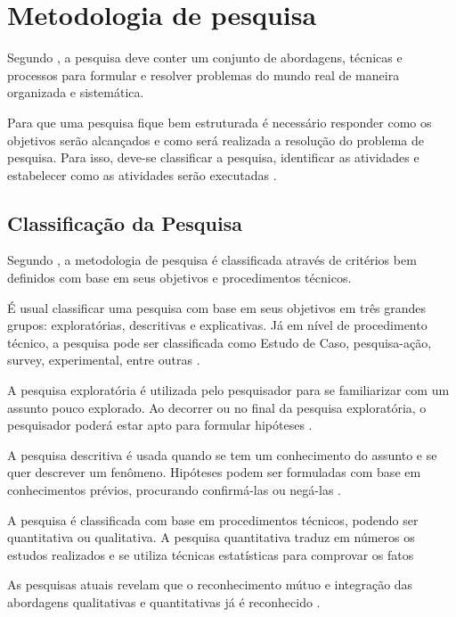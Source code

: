  \chapter{Metodologia de pesquisa}
\label{sec:metodologia}

Segundo , a pesquisa deve conter um conjunto de abordagens, técnicas e processos para formular e resolver problemas do mundo real de maneira organizada e sistemática.

Para que uma pesquisa fique bem estruturada é necessário responder como os objetivos serão alcançados e  como será realizada a resolução do problema de pesquisa. Para isso, deve-se classificar a pesquisa, identificar as atividades e estabelecer como as atividades serão executadas \cite{forcon2014}.

\section{Classificação da Pesquisa}

Segundo , a metodologia de pesquisa é classificada através de critérios bem definidos com base em seus objetivos e procedimentos técnicos.

É usual classificar uma pesquisa com base em seus objetivos em três grandes grupos: exploratórias, descritivas e explicativas. Já em nível de procedimento técnico, a pesquisa pode ser classificada como Estudo de Caso, pesquisa-ação, survey, experimental, entre outras \cite[pág.~41]{gil2008}.

A pesquisa exploratória é utilizada pelo pesquisador para se familiarizar com um assunto pouco explorado. Ao decorrer ou no final da pesquisa exploratória, o pesquisador poderá estar apto para formular hipóteses \cite{giudice}.

A pesquisa descritiva é usada quando se tem um conhecimento do assunto e se quer descrever um fenômeno. Hipóteses podem ser formuladas com base em conhecimentos prévios, procurando confirmá-las ou negá-las \cite[pág.~21]{fonseca2002}.

A pesquisa é classificada com base em procedimentos técnicos, podendo ser quantitativa ou qualitativa. A pesquisa quantitativa traduz em números os estudos realizados e se utiliza técnicas estatísticas para comprovar os fatos \cite[pág.~9]{rodrigues2007}


As pesquisas atuais revelam que o reconhecimento mútuo e integração das abordagens qualitativas e quantitativas já é reconhecido \cite{serapioni}.

